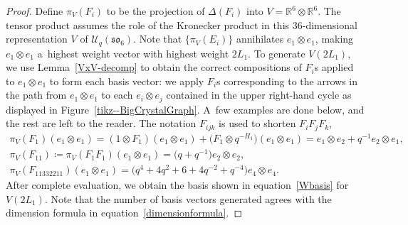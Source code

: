 \documentclass[pdftex]{sigma}
\numberwithin{equation}{section}
\theoremstyle{definition}
\begin{document}
\begin{proof}
 Define $\pi_V(F_i)$ to be the projection of $\Delta(F_i)$ into $V = \mathbb{R}^6 \otimes \mathbb{R}^6$. The tensor product assumes the role of the Kronecker product in this 36-dimensional representation $V$ of $\mathcal{U}_q(\mathfrak{so}_6)$. Note that $\{\pi_V(E_i)\}$ annihilates $e_1 \otimes e_1$, making $e_1 \otimes e_1$ a~highest weight vector with highest weight $2L_1$. To generate $V(2L_1)$, we use Lemma~\ref{VxV-decomp} to obtain the correct compositions of $F_i$s applied to $e_1 \otimes e_1$ to form each basis vector: we apply $F_i$s corresponding to the arrows in the path from $e_1 \otimes e_1$ to each $e_i \otimes e_j$ contained in the upper right-hand cycle as displayed in Figure~\ref{tikz--BigCrystalGraph}. A~few examples are done below, and the rest are left to the reader. The notation $F_{ijk}$ is used to shorten $F_iF_jF_k$,
 \begin{gather*}
 \pi_V(F_1)(e_1 \otimes e_1) = (1 \otimes F_1)(e_1 \otimes e_1) + \bigl(F_1 \otimes q^{-H_1}\bigr)(e_1 \otimes e_1)
 = e_1 \otimes e_2 + q^{-1}e_2 \otimes e_1, \\
 \pi_V(F_{11}) \coloneqq \pi_V(F_1F_1)(e_1 \otimes e_1) = \bigl(q+q^{-1}\bigr)e_2 \otimes e_2 , \\
 \pi_V(F_{11332211}) (e_1 \otimes e_1) = \bigl(q^4 + 4q^2 + 6 + 4q^{-2} + q^{-4}\bigr)e_4 \otimes e_4.
 \end{gather*}
 After complete evaluation, we obtain the basis shown in equation~\eqref{Wbasis} for $V(2L_1)$. Note that the number of basis vectors generated agrees with the dimension formula in equation~\eqref{dimensionformula}.
\end{proof}
\end{document}
